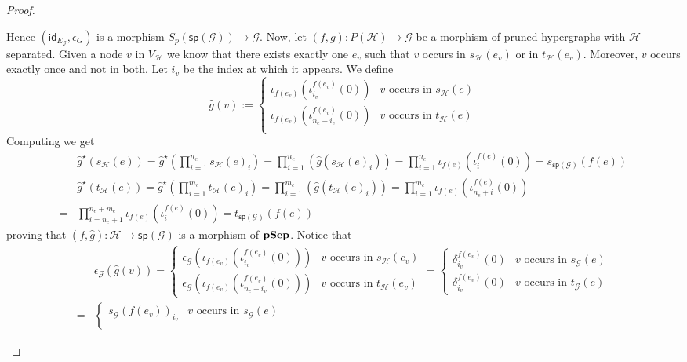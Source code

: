 \documentclass[3p]{elsarticle}
\newcommand{\catname}[1]{\textbf{\textup{#1}}}
\newcommand{\pshyp}{\catname{pSep}}
\renewcommand{\sp}{\mathsf{sp}}
\newcommand{\id}[1]{\mathsf{id}_{#1}}
\theoremstyle{remark}
\theoremstyle{definition}
\begin{document}
\begin{proof}
\begin{enumerate}
\smallskip 
Hence $(\id{E_{\mathcal{G}}}, \epsilon_{G})$ is a morphism $S_p(\sp(\mathcal{G}))\to \mathcal{G}$. Now, let $(f,g)\colon P(\mathcal{H})\to \mathcal{G}$ be a  morphism of pruned hypergraphs with $\mathcal{H}$ separated. Given a node $v$ in $V_{\mathcal{H}}$ we know that there exists exactly one $e_v$ such that $v$ occurs in $s_{\mathcal{H}}(e_v)$ or in $t_{\mathcal{H}}(e_v)$. Moreover, $v$ occurs exactly once and not in both. Let $i_v$ be the index at which it appears. We define
\[\hat{g}(v):=\begin{cases}
	\iota_{f(e_v)}(\iota^{f(e_v)}_{i_v}(0)) & v \text{ occurs in } s_{\mathcal{H}}(e)\\
	\iota_{f(e_v)}(\iota^{f(e_v)}_{n_e + i_v}(0)) & v \text{ occurs in } t_{\mathcal{H}}(e)\\
\end{cases}\]
Computing we get
\begin{align*}
	&\hat{g}^\star(s_{\mathcal{H}}(e))= \hat{g}^\star(\prod_{i=1}^{n_e} s_{\mathcal{H}}(e)_i)=\prod_{i=1}^{n_e}(\hat{g}(s_{\mathcal{H}}(e)_i))=\prod_{i=1}^{n_e}\iota_{f(e)}( \iota^{f(e)}_i(0))=s_{\sp(\mathcal{G})}(f(e))\\
	&\hat{g}^\star(t_{\mathcal{H}}(e))= \hat{g}^\star(\prod_{i=1}^{m_e} t_{\mathcal{H}}(e)_i)=\prod_{i=1}^{m_e}(\hat{g}(t_{\mathcal{H}}(e)_i))=\prod_{i=1}^{m_e}\iota_{f(e)}( \iota^{f(e)}_{n_e+i}(0))\\=&\prod_{i=n_e + 1}^{n_e + m_e}\iota_{f(e)}( \iota^{f(e)}_{i}(0))=t_{\sp(\mathcal{G})}(f(e))
\end{align*}
proving that $(f, \hat{g})\colon \mathcal{H}\to\sp( \mathcal{G})$ is a morphism of $\pshyp$. Notice that	
\begin{align*}
	&\epsilon_\mathcal{G}(\hat{g}(v))=\begin{cases}
		\epsilon_\mathcal{G}(\iota_{f(e_v)}(\iota^{f(e_v)}_{i_v}(0))) & v \text{ occurs in } s_{\mathcal{H}}(e_v)\\
		\epsilon_\mathcal{G}(\iota_{f(e_v)}(\iota^{f(e_v)}_{n_e + i_v}(0))) & v \text{ occurs in } t_{\mathcal{H}}(e_v)
	\end{cases}=	\begin{cases}
		\delta^{f(e_v)}_{i_v}(0)& v \text{ occurs in } s_{\mathcal{G}}(e)\\
		\delta^{f(e_v)}_{i_v}(0)& v \text{ occurs in } t_{\mathcal{G}}(e)
	\end{cases}\\ =&
	\begin{cases}
		s_{\mathcal{G}}(f(e_v))_{i_v}& v \text{ occurs in } s_{\mathcal{G}}(e)\\

\end{cases}
\end{align*}
\end{enumerate}
\end{proof}
\end{document}
